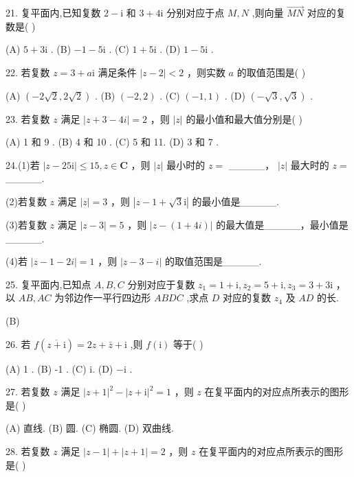 \documentclass[10pt]{article}
\begin{document}
21. 复平面内,已知复数 \(2 - \mathrm{i}\) 和 \(3 + 4\mathrm{i}\) 分别对应于点 \(M,N\) ,则向量 \(\overrightarrow{MN}\) 对应的复数是( )

(A) \(5 + 3\mathrm{i}\) . (B) \(- 1 - 5\mathrm{i}\) . (C) \(1 + 5\mathrm{i}\) . (D) \(1 - 5\mathrm{i}\) .

22. 若复数 \(z = 3 + a\mathrm{i}\) 满足条件 \(\left| {z - 2}\right|  < 2\) ，则实数 \(a\) 的取值范围是( )

(A) \(\left( {-2\sqrt{2},2\sqrt{2}}\right)\) . (B) \(\left( {-2,2}\right)\) . (C) \(\left( {-1,1}\right)\) . (D) \(\left( {-\sqrt{3},\sqrt{3}}\right)\) .

23. 若复数 \(z\) 满足 \(\left| {z + 3 - {4i}}\right|  = 2\) ，则 \(\left| z\right|\) 的最小值和最大值分别是( )

(A) 1 和 9 . (B) 4 和 10 . (C) 5 和 11. (D) 3 和 7 .

24.(1)若 \(\left| {z - {25}\mathrm{i}}\right|  \leq  {15},z \in  \mathbf{C}\) ，则 \(\left| z\right|\) 最小时的 \(z =\) \_\_\_\_\_， \(\left| z\right|\) 最大时的 \(z =\) \_\_\_\_\_.

(2)若复数 \(z\) 满足 \(\left| z\right|  = 3\) ，则 \(\left| {z - 1 + \sqrt{3}\mathrm{i}}\right|\) 的最小值是\_\_\_\_\_.

(3)若复数 \(z\) 满足 \(\left| {z - 3}\right|  = 5\) ，则 \(\left| {z - \left( {1 + {4i}}\right) }\right|\) 的最大值是\_\_\_\_\_，最小值是\_\_\_\_\_.

(4)若 \(\left| {z - 1 - {2i}}\right|  = 1\) ，则 \(\left| {z - 3 - i}\right|\) 的取值范围是\_\_\_\_\_.

25. 复平面内,已知点 \(A,B,C\) 分别对应于复数 \({z}_{1} = 1 + \mathrm{i},{z}_{2} = 5 + \mathrm{i},{z}_{3} = 3 + 3\mathrm{i}\) ，以 \({AB},{AC}\) 为邻边作一平行四边形 \({ABDC}\) ,求点 \(D\) 对应的复数 \({z}_{4}\) 及 \({AD}\) 的长.

(B)

26. 若 \(f\left( \overline{z + \mathrm{i}}\right)  = {2z} + \bar{z} + \mathrm{i}\) ,则 \(f\left( \mathrm{i}\right)\) 等于( )

(A) 1 . (B) -1 . (C) i. (D) \(- \mathrm{i}\) .

27. 若复数 \(z\) 满足 \({\left| z + 1\right| }^{2} - {\left| z + \mathrm{i}\right| }^{2} = 1\) ，则 \(z\) 在复平面内的对应点所表示的图形是( )

(A) 直线. (B) 圆. (C) 椭圆. (D) 双曲线.

28. 若复数 \(z\) 满足 \(\left| {z - 1}\right|  + \left| {z + 1}\right|  = 2\) ，则 \(z\) 在复平面内的对应点所表示的图形是( )
\end{document}

